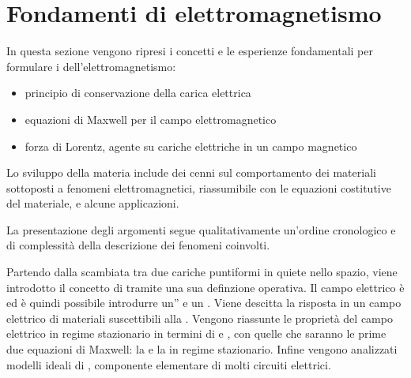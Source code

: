 \documentclass[letterpaper,10pt,italian]{jupyterBook}
\begin{document}
\chapter{Fondamenti di elettromagnetismo}
\label{\detokenize{ch/electromagnetism/em:fondamenti-di-elettromagnetismo}}\label{\detokenize{ch/electromagnetism/em:physics-hs-electromagnetism-em}}\label{\detokenize{ch/electromagnetism/em::doc}}
\sphinxAtStartPar
In questa sezione vengono ripresi i concetti e le esperienze fondamentali per formulare i  dell’elettromagnetismo:
\begin{itemize}
\item {} 
\sphinxAtStartPar
principio di conservazione della carica elettrica

\item {} 
\sphinxAtStartPar
equazioni di Maxwell per il campo elettromagnetico

\item {} 
\sphinxAtStartPar
forza di Lorentz, agente su cariche elettriche in un campo magnetico

\end{itemize}

\sphinxAtStartPar
Lo sviluppo della materia include dei cenni sul comportamento dei materiali sottoposti a fenomeni elettromagnetici, riassumibile con le equazioni costitutive del materiale, e alcune applicazioni.

\sphinxAtStartPar
La presentazione degli argomenti segue qualitativamente un’ordine cronologico e di complessità della descrizione dei fenomeni coinvolti.

\sphinxAtStartPar
{\hyperref[\detokenize{ch/electromagnetism/electrostatics:physics-hs-electromagnetism-electrostatics}]{}} Partendo dalla  scambiata tra due cariche puntiformi in quiete nello spazio, viene introdotto il concetto di  tramite una sua definzione operativa. Il campo elettrico è  ed è quindi possibile introdurre un” e un . Viene descitta la risposta in un campo elettrico di materiali suscettibili alla . Vengono riassunte le proprietà del campo elettrico in regime stazionario in termini di  e , con quelle che saranno le prime due equazioni di Maxwell: la  e la  in regime stazionario. Infine vengono analizzati modelli ideali di , componente elementare di molti circuiti elettrici.
\end{document}
